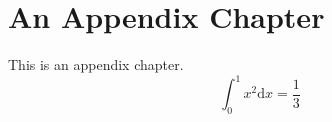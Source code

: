 \renewcommand{\theequation}{\Alph{chapter}.\arabic{equation}}
\chapter{An Appendix Chapter}

This is an appendix chapter.
$$
\int_0^1 x^2 \text{d} x = \frac{1}{3}
$$